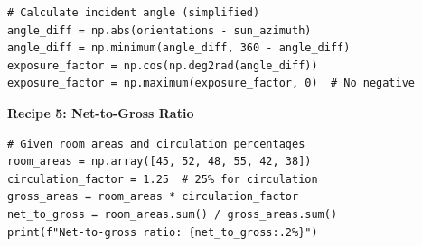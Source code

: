 \begin{tcolorbox}[
    title=Copy-Paste Recipes,
    colframe=gray,
    colback = white,
    arc=2mm
]
\begin{lstlisting}[basicstyle=\ttfamily\footnotesize,breaklines=true,columns=fullflexible,keepspaces=true,xleftmargin=0pt]
# Calculate incident angle (simplified)
angle_diff = np.abs(orientations - sun_azimuth)
angle_diff = np.minimum(angle_diff, 360 - angle_diff)
exposure_factor = np.cos(np.deg2rad(angle_diff))
exposure_factor = np.maximum(exposure_factor, 0)  # No negative

\end{lstlisting}

\textbf{Recipe 5: Net-to-Gross Ratio}
\begin{lstlisting}[basicstyle=\ttfamily\footnotesize,breaklines=true,columns=fullflexible,keepspaces=true,xleftmargin=0pt]
# Given room areas and circulation percentages
room_areas = np.array([45, 52, 48, 55, 42, 38])
circulation_factor = 1.25  # 25% for circulation
gross_areas = room_areas * circulation_factor
net_to_gross = room_areas.sum() / gross_areas.sum()
print(f"Net-to-gross ratio: {net_to_gross:.2%}")

\end{lstlisting}
\end{tcolorbox}


